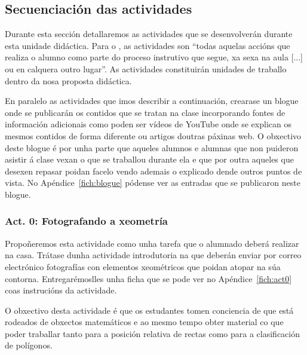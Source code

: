 \subsection{Secuenciación das actividades}

Durante esta sección detallaremos as actividades que se desenvolverán durante esta unidade didáctica. Para o , as actividades son ``todas aquelas accións que realiza o alumno como parte do proceso instrutivo que segue, xa sexa na aula [...] ou en calquera outro lugar''. As actividades constituirán unidades de traballo dentro da nosa proposta didáctica.

En paralelo as actividades que imos describir a continuación, crearase un blogue onde se publicarán os contidos que se tratan na clase incorporando fontes de información adicionais como poden ser vídeos de YouTube onde se explican os mesmos contidos de forma diferente ou artigos doutras páxinas web. O obxectivo deste blogue é por unha parte que aqueles alumnos e alumnas que non puideron asistir á clase vexan o que se traballou durante ela e que por outra aqueles que desexen repasar poidan facelo vendo ademais o explicado dende outros puntos de vista. No Apéndice~\ref{fich:blogue} pódense ver as entradas que se publicaron neste blogue.

\subsubsection{Act. 0: Fotografando a xeometría}\label{act:fotografias}
Propoñeremos esta actividade como unha tarefa que o alumnado deberá realizar na casa. Trátase dunha actividade introdutoria na que deberán enviar por correo electrónico fotografías con elementos xeométricos que poidan atopar na súa contorna. Entregarémoslles unha ficha que se pode ver no  Apéndice~\ref{fich:act0} coas instrucións da actividade.

O obxectivo desta actividade é que os estudantes tomen conciencia de que está rodeados de obxectos matemáticos e ao mesmo tempo obter material co que poder traballar tanto para a posición relativa de rectas como para a clasificación de polígonos.

